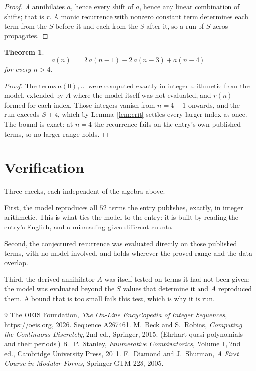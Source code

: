 \documentclass[11pt,a4paper]{article}
\theoremstyle{plain}
\newtheorem{theorem}{Theorem}
\theoremstyle{definition}
\begin{document}
\begin{proof}
$A$ annihilates $a$, hence every shift of $a$, hence any linear combination of shifts; that is
$r$. A monic recurrence with nonzero constant term determines each term from the $S$ before it
and each from the $S$ after it, so a run of $S$ zeros propagates.
\end{proof}

\begin{theorem}
\[
a(n)\;=\;2\,a(n-1) - 2\,a(n-3) + a(n-4)
\]
for every $n>4$.
\end{theorem}

\begin{proof}
The terms $a(0),\dots$ were computed exactly in integer arithmetic from the model, extended by
$A$ where the model itself was not evaluated, and $r(n)$ formed for each index. Those integers
vanish from $n=4+1$ onwards, and the run exceeds $S+4$, which by
Lemma~\ref{lem:crit} settles every larger index at once. The bound is exact: at $n=4$ the recurrence fails on the entry's own published terms, so no larger range holds.
\end{proof}

\section{Verification}

Three checks, each independent of the algebra above.

First, the model reproduces all $52$ terms the entry publishes, exactly, in integer
arithmetic. This is what ties the model to the entry: it is built by reading the entry's
English, and a misreading gives different counts.

Second, the conjectured recurrence was evaluated directly on those published terms, with no
model involved, and holds wherever the proved range and the data overlap.

Third, the derived annihilator $A$ was itself tested on terms it had not been given: the model
was evaluated beyond the $S$ values that determine it and $A$ reproduced them. A bound that is
too small fails this test, which is why it is run.

\begin{thebibliography}{9}
 The OEIS Foundation, \emph{The On-Line Encyclopedia of Integer
Sequences}, \url{https://oeis.org}, 2026. Sequence A267461.
 M.~Beck and S.~Robins, \emph{Computing the Continuous Discretely},
2nd ed., Springer, 2015. (Ehrhart quasi-polynomials and their periods.)
 R.~P.~Stanley, \emph{Enumerative Combinatorics}, Volume 1, 2nd ed.,
Cambridge University Press, 2011.
 F.~Diamond and J.~Shurman, \emph{A First Course in Modular Forms},
Springer GTM 228, 2005.
\end{thebibliography}
\end{document}
